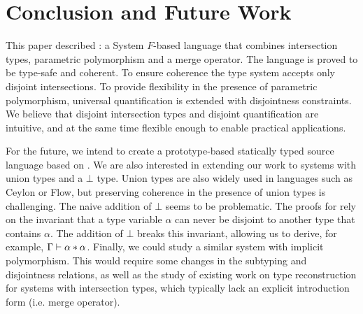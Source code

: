 \section{Conclusion and Future Work}
\label{sec:conclusion}

This paper described \name: a System $F$-based language that combines
intersection types, parametric polymorphism and a merge operator.
The language is proved to be type-safe and coherent.
To ensure coherence the type system accepts only
disjoint intersections. To provide flexibility in the presence of parametric polymorphism,
universal quantification is extended with
disjointness constraints. We believe that disjoint intersection types
and disjoint quantification are intuitive, and at the same time
flexible enough to enable practical applications.


For the future, we intend to create a prototype-based statically typed
source language based on \name.  We are also interested in extending
our work to systems with union types and a $\bot$ type. Union types
are also widely used in languages such as Ceylon or Flow, but
preserving coherence in the presence of union types is
challenging. The naive addition of $\bot$ seems to be problematic. 
The proofs for \name rely on the invariant that a type variable $\alpha$ can never be disjoint 
to another type that contains $\alpha$. The addition of $\bot$ breaks
this invariant, allowing us to derive, for example, $\Gamma \vdash \alpha * \alpha$.
Finally, we could study a similar system with implicit polymorphism.
This would require some changes in the subtyping and disjointness relations,
as well as the study of existing work on type reconstruction for systems with 
intersection types, which typically lack an explicit introduction form 
(i.e. merge operator).




